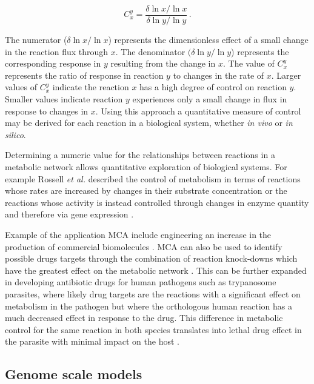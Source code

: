 \begin{equation}\label{fcc}
C_{x}^{y} = \frac{ \delta \ln x / \ln x}{\delta \ln y / \ln y} \, .
\end{equation}

The numerator ($\delta \ln x / \ln x$) represents the dimensionless effect of a small change in the reaction flux through $x$. The denominator $(\delta \ln y / \ln y$) represents the corresponding response in $y$ resulting from the change in $x$. The value of $C_{x}^{y}$ represents the ratio of response in reaction $y$ to changes in the rate of $x$. Larger values of $C_{x}^{y}$ indicate the reaction $x$ has a high degree of control on reaction $y$. Smaller values indicate reaction $y$ experiences only a small change in flux in response to changes in $x$. Using this approach a quantitative measure of control may be derived for each reaction in a biological system, whether \emph{in vivo} or \emph{in silico}.

Determining a numeric value for the relationships between reactions in a metabolic network allows quantitative exploration of biological systems. For example Rossell \emph{et al.} described the control of metabolism in terms of reactions whose rates are increased by changes in their substrate concentration or the reactions whose activity is instead controlled through changes in enzyme quantity and therefore via gene expression \cite{rossell2006,daran-lapujade2007}.

Example of the application MCA include engineering an increase in the production of commercial biomolecules \cite{niederberger1992}. MCA can also be used to identify possible drugs targets through the combination of reaction knock-downs which have the greatest effect on the metabolic network \cite{lehar2008,hopkins2008}. This can be further expanded in developing antibiotic drugs for human pathogens such as trypanosome parasites, where likely drug targets are the reactions with a significant effect on metabolism in the pathogen but where the orthologous human reaction has a much decreased effect in response to the drug. This difference in metabolic control for the same reaction in both species translates into lethal drug effect in the parasite with minimal impact on the host \cite{hornberg2007}.

\subsection{Genome scale models}%

